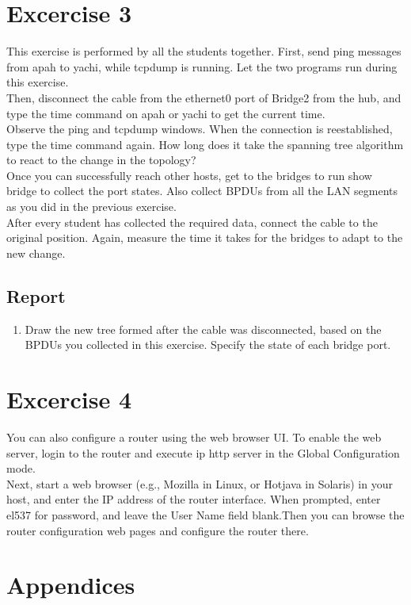 \documentclass[10pt,a4paper]{article}
\numberwithin{equation}{section}
\numberwithin{figure}{section}
\numberwithin{table}{section}
\begin{document}
\section*{Excercise 3}
  This exercise is performed by all the students together. First, send ping messages from apah to yachi, while tcpdump is running. Let the two programs run during this exercise. \\
Then, disconnect the cable from the ethernet0 port of Bridge2 from the hub, and type the time command on apah or yachi to get the current time. \\
Observe the ping and tcpdump windows. When the connection is reestablished, type the time command again. How long does it take the spanning tree algorithm to react to the change in the topology? \\
Once you can successfully reach other hosts, get to the bridges to run show bridge to collect the port states. Also collect BPDUs from all the LAN segments as you did in the previous exercise. \\
After every student has collected the required data, connect the cable to the original position. Again, measure the time it takes for the bridges to adapt to the new change. 


    \subsection*{Report}
    \begin{enumerate}
        \item Draw the new tree formed after the cable was disconnected, based on the BPDUs you collected in this exercise. Specify the state of each bridge port. 
    \end{enumerate}

\section*{Excercise 4}
 You can also configure a router using the web browser UI. To enable the web server, login to the router and execute ip http server in the Global Configuration mode. \\
Next, start a web browser (e.g., Mozilla in Linux, or Hotjava in Solaris) in your host, and enter the IP address of the router interface. When prompted, enter el537 for password, and leave the User Name field blank.Then you can browse the router configuration web pages and configure the router there. 
\fi

\appendix
\section*{Appendices}
\renewcommand{\thesubsection}{\Alph{subsection}}
\end{document}

